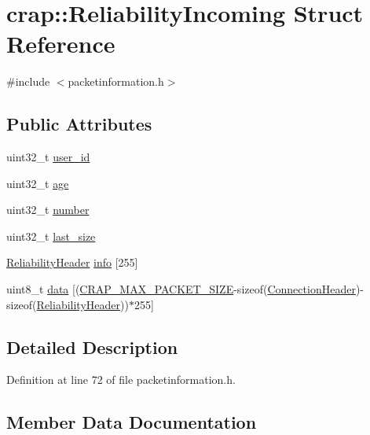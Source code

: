 \hypertarget{structcrap_1_1_reliability_incoming}{}\section{crap\+:\+:Reliability\+Incoming Struct Reference}
\label{structcrap_1_1_reliability_incoming}


{\ttfamily \#include $<$packetinformation.\+h$>$}

\subsection*{Public Attributes}
\begin{DoxyCompactItemize}
\item 
uint32\+\_\+t \hyperlink{structcrap_1_1_reliability_incoming_a7854c79cee5bc4df71d0681b4f4707d8}{user\+\_\+id}
\item 
uint32\+\_\+t \hyperlink{structcrap_1_1_reliability_incoming_a06a4e1b5acb48747a356c5d0443f298c}{age}
\item 
uint32\+\_\+t \hyperlink{structcrap_1_1_reliability_incoming_a581fa65c9a0ebdfd45753b016318a3b5}{number}
\item 
uint32\+\_\+t \hyperlink{structcrap_1_1_reliability_incoming_aa122ede51c3dcfa0916ae170e7e3b241}{last\+\_\+size}
\item 
\hyperlink{structcrap_1_1_reliability_header}{Reliability\+Header} \hyperlink{structcrap_1_1_reliability_incoming_a563ea21dbd6e8d48af46f8d7c9cae93a}{info} \mbox{[}255\mbox{]}
\item 
uint8\+\_\+t \hyperlink{structcrap_1_1_reliability_incoming_a1f490fd1a8a59c0a9be4e938c4d60ea1}{data} \mbox{[}(\hyperlink{packetinformation_8h_a0811d6d7f9c275bf8f3af82d61a31e0f}{C\+R\+A\+P\+\_\+\+M\+A\+X\+\_\+\+P\+A\+C\+K\+E\+T\+\_\+\+S\+I\+Z\+E}-\/sizeof(\hyperlink{structcrap_1_1_connection_header}{Connection\+Header})-\/sizeof(\hyperlink{structcrap_1_1_reliability_header}{Reliability\+Header}))$\ast$255\mbox{]}
\end{DoxyCompactItemize}


\subsection{Detailed Description}


Definition at line 72 of file packetinformation.\+h.



\subsection{Member Data Documentation}
\hypertarget{structcrap_1_1_reliability_incoming_a06a4e1b5acb48747a356c5d0443f298c}{}
